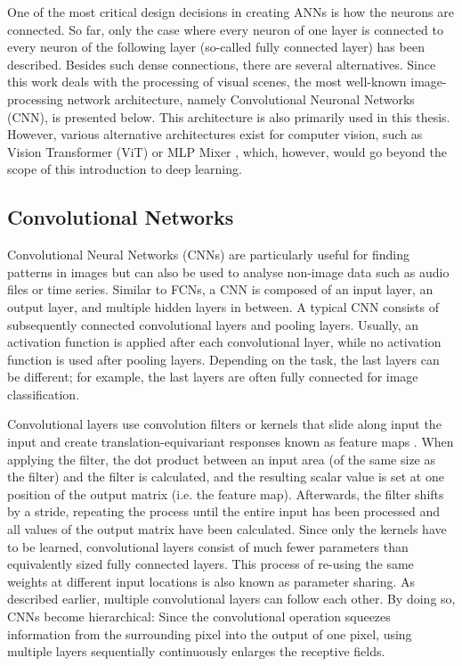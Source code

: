 One of the most critical design decisions in creating ANNs is how the neurons are connected.
So far, only the case where every neuron of one layer is connected to every neuron of the following layer (so-called fully connected layer) has been described. 
Besides such dense connections, there are several alternatives.
Since this work deals with the processing of visual scenes, the most well-known image-processing network architecture, namely Convolutional Neuronal Networks (CNN), is presented below. This architecture is also primarily used in this thesis. However, various alternative architectures exist for computer vision, such as Vision Transformer (ViT)  or MLP Mixer , which, however, would go beyond the scope of this introduction to deep learning.

\subsection{Convolutional Networks}
Convolutional Neural Networks (CNNs) are particularly useful for finding patterns in images but can also be used to analyse non-image data such as audio files or time series.
Similar to FCNs, a CNN is composed of an input layer, an output layer, and multiple hidden layers in between.
A typical CNN consists of subsequently connected convolutional layers and pooling layers.
Usually, an activation function is applied after each convolutional layer, while no activation function is used after pooling layers.
Depending on the task, the last layers can be different; for example, the last layers are often fully connected for image classification.

Convolutional layers use convolution filters or kernels that slide along input the input and create translation-equivariant \cite{Mouton_Myburgh_Davel_2020} responses known as feature maps .
When applying the filter, the dot product between an input area (of the same size as the filter) and the filter is calculated, and the resulting scalar value is set at one position of the output matrix (i.e. the feature map).
Afterwards, the filter shifts by a stride, repeating the process until the entire input has been processed and all values of the output matrix have been calculated.
Since only the kernels have to be learned, convolutional layers consist of much fewer parameters than equivalently sized fully connected layers.
This process of re-using the same weights at different input locations is also known as parameter sharing.
As described earlier, multiple convolutional layers can follow each other.
By doing so, CNNs become hierarchical: Since the convolutional operation squeezes information from the surrounding pixel into the output of one pixel, using multiple layers sequentially continuously enlarges the receptive fields.

